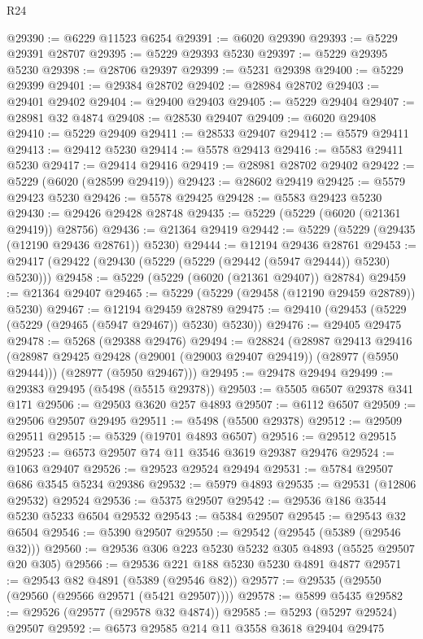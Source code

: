\begin{lexlean}{R24}
\begin{coremodule}
@29390 := @6229 @11523 @6254
@29391 := @6020 @29390
@29393 := @5229 @29391 @28707
@29395 := @5229 @29393 @5230
@29397 := @5229 @29395 @5230
@29398 := @28706 @29397
@29399 := @5231 @29398
@29400 := @5229 @29399
@29401 := @29384 @28702
@29402 := @28984 @28702
@29403 := @29401 @29402
@29404 := @29400 @29403
@29405 := @5229 @29404
@29407 := @28981 @32 @4874
@29408 := @28530 @29407
@29409 := @6020 @29408
@29410 := @5229 @29409
@29411 := @28533 @29407
@29412 := @5579 @29411
@29413 := @29412 @5230
@29414 := @5578 @29413
@29416 := @5583 @29411 @5230
@29417 := @29414 @29416
@29419 := @28981 @28702 @29402
@29422 := @5229 (@6020 (@28599 @29419))
@29423 := @28602 @29419
@29425 := @5579 @29423 @5230
@29426 := @5578 @29425
@29428 := @5583 @29423 @5230
@29430 := @29426 @29428 @28748
@29435 := @5229 (@5229 (@6020 (@21361 @29419)) @28756)
@29436 := @21364 @29419
@29442 := @5229 (@5229 (@29435 (@12190 @29436 @28761)) @5230)
@29444 := @12194 @29436 @28761
@29453 := @29417 (@29422 (@29430 (@5229 (@5229 (@29442 (@5947 @29444)) @5230) @5230)))
@29458 := @5229 (@5229 (@6020 (@21361 @29407)) @28784)
@29459 := @21364 @29407
@29465 := @5229 (@5229 (@29458 (@12190 @29459 @28789)) @5230)
@29467 := @12194 @29459 @28789
@29475 := @29410 (@29453 (@5229 (@5229 (@29465 (@5947 @29467)) @5230) @5230))
@29476 := @29405 @29475
@29478 := @5268 (@29388 @29476)
@29494 := @28824
    (@28987
      @29413
      @29416
      (@28987 @29425 @29428 (@29001 (@29003 @29407 @29419)) (@28977 (@5950 @29444)))
      (@28977 (@5950 @29467)))
@29495 := @29478 @29494
@29499 := @29383 @29495 (@5498 (@5515 @29378))
@29503 := @5505 @6507 @29378 @341 @171
@29506 := @29503 @3620 @257 @4893
@29507 := @6112 @6507
@29509 := @29506 @29507 @29495
@29511 := @5498 (@5500 @29378)
@29512 := @29509 @29511
@29515 := @5329 (@19701 @4893 @6507)
@29516 := @29512 @29515
@29523 := @6573 @29507 @74 @11 @3546 @3619 @29387 @29476
@29524 := @1063 @29407
@29526 := @29523 @29524 @29494
@29531 := @5784 @29507 @686 @3545 @5234 @29386
@29532 := @5979 @4893
@29535 := @29531 (@12806 @29532) @29524
@29536 := @5375 @29507
@29542 := @29536 @186 @3544 @5230 @5233 @6504 @29532
@29543 := @5384 @29507
@29545 := @29543 @32 @6504
@29546 := @5390 @29507
@29550 := @29542 (@29545 (@5389 (@29546 @32)))
@29560 := @29536 @306 @223 @5230 @5232 @305 @4893 (@5525 @29507 @20 @305)
@29566 := @29536 @221 @188 @5230 @5230 @4891 @4877
@29571 := @29543 @82 @4891 (@5389 (@29546 @82))
@29577 := @29535 (@29550 (@29560 (@29566 @29571 (@5421 @29507))))
@29578 := @5899 @5435
@29582 := @29526 (@29577 (@29578 @32 @4874))
@29585 := @5293 (@5297 @29524) @29507
@29592 := @6573 @29585 @214 @11 @3558 @3618 @29404 @29475

\end{coremodule}
\end{lexlean}
